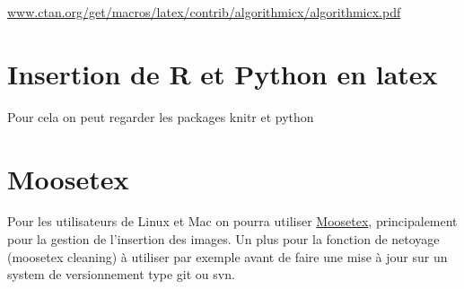 \noindent\url{www.ctan.org/get/macros/latex/contrib/algorithmicx/algorithmicx.pdf}

\section{Insertion de R et Python en latex}

Pour cela on peut regarder les packages knitr
et python


\section{Moosetex}

Pour les utilisateurs de Linux et Mac on pourra utiliser 
\href{http://www.math.u-bordeaux1.fr/~cdeledal/moosetex}{Moosetex},
principalement pour la gestion de l'insertion des images.
Un plus pour la fonction de netoyage (moosetex cleaning) \`a utiliser par exemple
avant de faire une mise \`a jour sur un system de versionnement type git ou svn.
